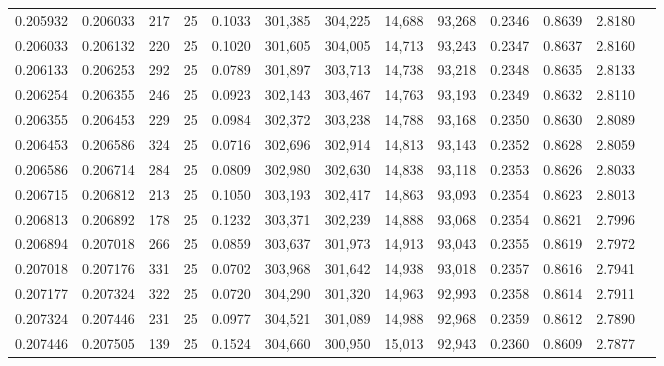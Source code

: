 \begin{tabular}{rrrrrrrrrrrrr}
0.205932 & 0.206033 &   217 &  25 &                                     0.1033 & 301,385 & 304,225 &  14,688 &  93,268 & 0.2346 & 0.8639 & 2.8180 \\
0.206033 & 0.206132 &   220 &  25 &                                     0.1020 & 301,605 & 304,005 &  14,713 &  93,243 & 0.2347 & 0.8637 & 2.8160 \\
0.206133 & 0.206253 &   292 &  25 &                                     0.0789 & 301,897 & 303,713 &  14,738 &  93,218 & 0.2348 & 0.8635 & 2.8133 \\
0.206254 & 0.206355 &   246 &  25 &                                     0.0923 & 302,143 & 303,467 &  14,763 &  93,193 & 0.2349 & 0.8632 & 2.8110 \\
0.206355 & 0.206453 &   229 &  25 &                                     0.0984 & 302,372 & 303,238 &  14,788 &  93,168 & 0.2350 & 0.8630 & 2.8089 \\
0.206453 & 0.206586 &   324 &  25 &                                     0.0716 & 302,696 & 302,914 &  14,813 &  93,143 & 0.2352 & 0.8628 & 2.8059 \\
0.206586 & 0.206714 &   284 &  25 &                                     0.0809 & 302,980 & 302,630 &  14,838 &  93,118 & 0.2353 & 0.8626 & 2.8033 \\
0.206715 & 0.206812 &   213 &  25 &                                     0.1050 & 303,193 & 302,417 &  14,863 &  93,093 & 0.2354 & 0.8623 & 2.8013 \\
0.206813 & 0.206892 &   178 &  25 &                                     0.1232 & 303,371 & 302,239 &  14,888 &  93,068 & 0.2354 & 0.8621 & 2.7996 \\
0.206894 & 0.207018 &   266 &  25 &                                     0.0859 & 303,637 & 301,973 &  14,913 &  93,043 & 0.2355 & 0.8619 & 2.7972 \\
0.207018 & 0.207176 &   331 &  25 &                                     0.0702 & 303,968 & 301,642 &  14,938 &  93,018 & 0.2357 & 0.8616 & 2.7941 \\
0.207177 & 0.207324 &   322 &  25 &                                     0.0720 & 304,290 & 301,320 &  14,963 &  92,993 & 0.2358 & 0.8614 & 2.7911 \\
0.207324 & 0.207446 &   231 &  25 &                                     0.0977 & 304,521 & 301,089 &  14,988 &  92,968 & 0.2359 & 0.8612 & 2.7890 \\
0.207446 & 0.207505 &   139 &  25 &                                     0.1524 & 304,660 & 300,950 &  15,013 &  92,943 & 0.2360 & 0.8609 & 2.7877 \\

\end{tabular}

